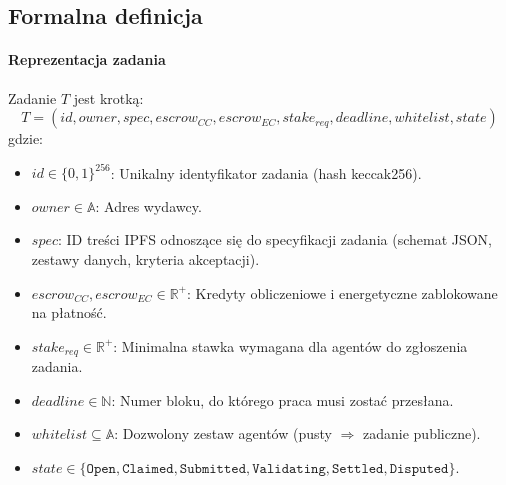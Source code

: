 \documentclass[11pt]{article}
\begin{document}
\subsection{Formalna definicja}
\paragraph{Reprezentacja zadania} Zadanie $T$ jest krotką:
\begin{equation}
T = (id, owner, spec, escrow_{CC}, escrow_{EC}, stake_{req}, deadline, whitelist, state)
\end{equation}
gdzie:
\begin{itemize}[noitemsep]
  \item $id \in \{0,1\}^{256}$: Unikalny identyfikator zadania (hash keccak256).
  \item $owner \in \mathbb{A}$: Adres wydawcy.
  \item $spec$: ID treści IPFS odnoszące się do specyfikacji zadania (schemat JSON, zestawy danych, kryteria akceptacji).
  \item $escrow_{CC}, escrow_{EC} \in \mathbb{R}^+$: Kredyty obliczeniowe i energetyczne zablokowane na płatność.
  \item $stake_{req} \in \mathbb{R}^+$: Minimalna stawka wymagana dla agentów do zgłoszenia zadania.
  \item $deadline \in \mathbb{N}$: Numer bloku, do którego praca musi zostać przesłana.
  \item $whitelist \subseteq \mathbb{A}$: Dozwolony zestaw agentów (pusty $\Rightarrow$ zadanie publiczne).
  \item $state \in \{\texttt{Open}, \texttt{Claimed}, \texttt{Submitted}, \texttt{Validating}, \texttt{Settled}, \texttt{Disputed}\}$.
\end{itemize}
\end{document}
